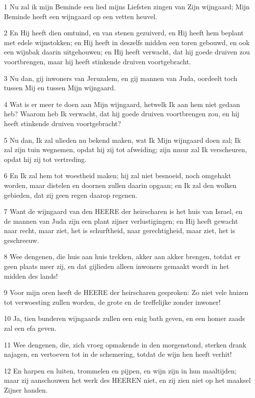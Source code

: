 \par 1 Nu zal ik mijn Beminde een lied mijns Liefsten zingen van Zijn wijngaard; Mijn Beminde heeft een wijngaard op een vetten heuvel.
\par 2 En Hij heeft dien omtuind, en van stenen gezuiverd, en Hij heeft hem beplant met edele wijnstokken; en Hij heeft in deszelfs midden een toren gebouwd, en ook een wijnbak daarin uitgehouwen; en Hij heeft verwacht, dat hij goede druiven zou voortbrengen, maar hij heeft stinkende druiven voortgebracht.
\par 3 Nu dan, gij inwoners van Jeruzalem, en gij mannen van Juda, oordeelt toch tussen Mij en tussen Mijn wijngaard.
\par 4 Wat is er meer te doen aan Mijn wijngaard, hetwelk Ik aan hem niet gedaan heb? Waarom heb Ik verwacht, dat hij goede druiven voortbrengen zou, en hij heeft stinkende druiven voortgebracht?
\par 5 Nu dan, Ik zal ulieden nu bekend maken, wat Ik Mijn wijngaard doen zal; Ik zal zijn tuin wegnemen, opdat hij zij tot afweiding; zijn muur zal Ik verscheuren, opdat hij zij tot vertreding.
\par 6 En Ik zal hem tot woestheid maken; hij zal niet besnoeid, noch omgehakt worden, maar distelen en doornen zullen daarin opgaan; en Ik zal den wolken gebieden, dat zij geen regen daarop regenen.
\par 7 Want de wijngaard van den HEERE der heirscharen is het huis van Israel, en de mannen van Juda zijn een plant zijner verlustigingen; en Hij heeft gewacht naar recht, maar ziet, het is schurftheid, naar gerechtigheid, maar ziet, het is geschreeuw.
\par 8 Wee dengenen, die huis aan huis trekken, akker aan akker brengen, totdat er geen plaats meer zij, en dat gijlieden alleen inwoners gemaakt wordt in het midden des lands!
\par 9 Voor mijn oren heeft de HEERE der heirscharen gesproken: Zo niet vele huizen tot verwoesting zullen worden, de grote en de treffelijke zonder inwoner!
\par 10 Ja, tien bunderen wijngaards zullen een enig bath geven, en een homer zaads zal een efa geven.
\par 11 Wee dengenen, die, zich vroeg opmakende in den morgenstond, sterken drank najagen, en vertoeven tot in de schemering, totdat de wijn hen heeft verhit!
\par 12 En harpen en luiten, trommelen en pijpen, en wijn zijn in hun maaltijden; maar zij aanschouwen het werk des HEEREN niet, en zij zien niet op het maaksel Zijner handen.
